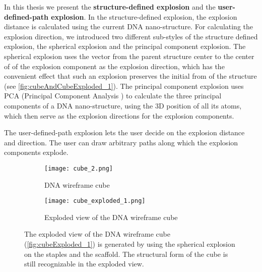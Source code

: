 \documentclass[draft,final]{vutinfth} %
\begin{document}
\par In this thesis we present the \textbf{structure-defined explosion} and the \textbf{user-defined-path explosion}. In the structure-defined explosion, the explosion distance is calculated using the current DNA nano-structure. For calculating the explosion direction, we introduced two different sub-styles of the structure defined explosion, the spherical explosion and the principal component explosion. The spherical explosion uses the vector from the parent structure center to the center of of the explosion component as the explosion direction, which has the convenient effect that such an explosion preserves the initial from of the structure (see \autoref{fig:cubeAndCubeExploded_1}). The principal component explosion uses PCA (Principal Component Analysis \cite{jolliffe2011principal}) to calculate the three principal components of a DNA nano-structure, using the 3D position of all its atoms, which then serve as the explosion directions for the explosion components.
\par The user-defined-path explosion lets the user decide on the explosion distance and direction. The user can draw arbitrary paths along which the explosion components explode.

\begin{figure}
\centering
\begin{subfigure}{0.5\textwidth}
  \centering
  \texttt{[image: cube\_2.png]}
  \caption{DNA wireframe cube}
  \label{fig:cube_1}
\end{subfigure}%
\begin{subfigure}{0.5\textwidth}
  \centering
  \texttt{[image: cube\_exploded\_1.png]}
  \caption{Exploded view of the DNA wireframe cube}
  \label{fig:cubeExploded_1}
\end{subfigure}
\caption{The exploded view of the DNA wireframe cube (\autoref{fig:cubeExploded_1}) is generated by using the spherical explosion on the staples and the scaffold. The structural form of the cube is still recognizable in the exploded view.}
\label{fig:cubeAndCubeExploded_1}
\end{figure}
\end{document}
